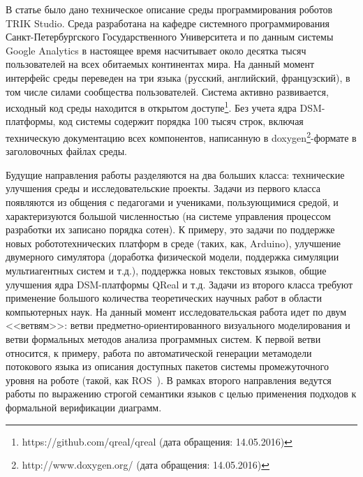 \documentclass[a5paper]{article}
\begin{document}
В статье было дано техническое описание среды программирования роботов TRIK Studio. Среда разработана на кафедре системного программирования Санкт-Петербургского Государственного Университета и по данным системы Google Analytics в настоящее время насчитывает около десятка тысяч пользователей на всех обитаемых континентах мира. На данный момент интерфейс среды переведен на три языка (русский, английский, французский), в том числе силами сообщества пользователей. Система активно развивается, исходный код среды находится в открытом доступе\footnote{https://github.com/qreal/qreal (дата обращения: 14.05.2016)}. Без учета ядра DSM-платформы, код системы содержит порядка 100 тысяч строк, включая техническую документацию всех компонентов, написанную в doxygen\footnote{http://www.doxygen.org/ (дата обращения: 14.05.2016)}-формате в заголовочных файлах среды.

Будущие направления работы разделяются на два больших класса: технические улучшения среды и исследовательские проекты. Задачи из первого класса появляются из общения с педагогами и учениками, пользующимися средой, и характеризуются большой численностью (на системе управления процессом разработки их записано порядка сотен). К примеру, это задачи по поддержке новых робототехнических платформ в среде (таких, как, Arduino), улучшение двумерного симулятора (доработка физической модели, поддержка симуляции мультиагентных систем и т.д.), поддержка новых текстовых языков, общие улучшения ядра DSM-платформы QReal и т.д. Задачи из второго класса требуют применение большого количества теоретических научных работ в области компьютерных наук. На данный момент исследовательская работа идет по двум <<ветвям>>: ветви предметно-ориентированного визуального моделирования и ветви формальных методов анализа программных систем. К первой ветви относится, к примеру, работа по автоматической генерации метамодели потокового языка из описания доступных пакетов системы промежуточного уровня на роботе (такой, как ROS~\cite{quigley2009ros}). В рамках второго направления ведутся работы по выражению строгой семантики языков с целью применения подходов к формальной верификации диаграмм.

\pagebreak



\end{document}
